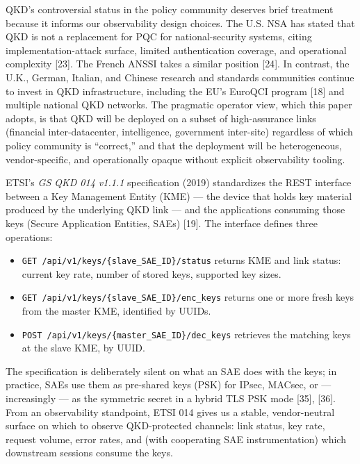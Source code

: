 QKD's controversial status in the policy community deserves brief
treatment because it informs our observability design choices. The U.S.
NSA has stated that QKD is not a replacement for PQC for
national-security systems, citing implementation-attack surface, limited
authentication coverage, and operational complexity {[}23{]}. The French
ANSSI takes a similar position {[}24{]}. In contrast, the U.K., German,
Italian, and Chinese research and standards communities continue to
invest in QKD infrastructure, including the EU's EuroQCI program
{[}18{]} and multiple national QKD networks. The pragmatic operator
view, which this paper adopts, is that QKD will be deployed on a subset
of high-assurance links (financial inter-datacenter, intelligence,
government inter-site) regardless of which policy community is
``correct,'' and that the deployment will be heterogeneous,
vendor-specific, and operationally opaque without explicit observability
tooling.

ETSI's \emph{GS QKD 014 v1.1.1} specification (2019) standardizes the
REST interface between a Key Management Entity (KME) --- the device that
holds key material produced by the underlying QKD link --- and the
applications consuming those keys (Secure Application Entities, SAEs)
{[}19{]}. The interface defines three operations:

\begin{itemize}
\tightlist
\item
  \texttt{GET\ /api/v1/keys/\{slave\_SAE\_ID\}/status} returns KME and
  link status: current key rate, number of stored keys, supported key
  sizes.
\item
  \texttt{GET\ /api/v1/keys/\{slave\_SAE\_ID\}/enc\_keys} returns one or
  more fresh keys from the master KME, identified by UUIDs.
\item
  \texttt{POST\ /api/v1/keys/\{master\_SAE\_ID\}/dec\_keys} retrieves
  the matching keys at the slave KME, by UUID.
\end{itemize}

The specification is deliberately silent on what an SAE does with the
keys; in practice, SAEs use them as pre-shared keys (PSK) for IPsec,
MACsec, or --- increasingly --- as the symmetric secret in a hybrid TLS
PSK mode {[}35{]}, {[}36{]}. From an observability standpoint, ETSI 014
gives us a stable, vendor-neutral surface on which to observe
QKD-protected channels: link status, key rate, request volume, error
rates, and (with cooperating SAE instrumentation) which downstream
sessions consume the keys.

